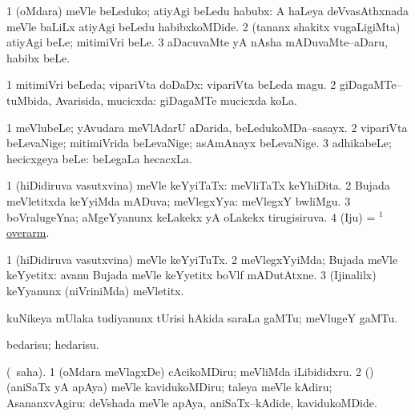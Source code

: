 \bentry
{}
\gl{\sakirx}
\bmng
\bnum
\num{1} (oMdara) meVle beLeduko; atiyAgi beLedu habubx:  A haLeya deVvasAthxnada meVle baLiLx atiyAgi beLedu habibxkoMDide. 
\num{2} (tananx shakitx \mo vugaLigiMta) atiyAgi beLe; mitimiVri beLe. 
\num{3} aDacuvaMte yA nAsha mADuvaMte--aDaru, habibx beLe. 
\enum
\emng
\eentry

\bentry
{}
\gl{\gu}
\bmng
\bnum
\num{1} mitimiVri beLeda; vipariVta doDaDx:  vipariVta beLeda magu. 
\num{2} giDagaMTe--tuMbida, Avarisida, mucicxda:  giDagaMTe mucicxda koLa. 
\enum
\emng
\eentry

\bentry
{}
\gl{\nA}
\bmng
\bnum
\num{1} meVlubeLe; yAvudara meVlAdarU aDarida, beLedukoMDa--sasayx. 
\num{2} vipariVta beLevaNige; mitimiVrida beLevaNige; asAmAnayx beLevaNige. 
\num{3} adhikabeLe; hecicxgeya beLe:  beLegaLa hecacxLa. 
\enum
\emng
\eentry

\bentry
{}
\gl{\gu}
\bmng
\bnum
\num{1} (hiDidiruva vasutxvina) meVle keYyiTaTx:  meVliTaTx keYhiDita. 
\num{2} Bujada meVletitxda keYyiMda mADuva; meVlegxYya:  meVlegxY bwliMgu. 
\num{3} boVralugeYna; aMgeYyanunx keLakekx yA oLakekx tirugisiruva. 
\num{4} (Iju) = \hyperlink{overarm(1)}{$^1$overarm}. 
\enum
\emng
\eentry

\bentry
{}
\gl{\kirxvi}
\bmng
\bnum
\num{1} (hiDidiruva vasutxvina) meVle keYyiTuTx. 
\num{2} meVlegxYyiMda; Bujada meVle keYyetitx:  avanu Bujada meVle keYyetitx boVlf mADutAtxne. 
\num{3} (Ijinalilx) keYyanunx (niVriniMda) meVletitx. 
\enum
\emng
\eentry

\bentry
{}
\gl{\nA}
\bmng
kuNikeya mUlaka tudiyanunx tUrisi hAkida saraLa gaMTu; meVlugeY gaMTu.  
\emng
\eentry

\bentry
{}
\gl{\kirx}


\noindent
\gl{\sakirx}
\bmng
bedarisu; hedarisu. 
\emng

\noindent
\gl{\akirx}
\bmng
(\sakirx\ saha). 
\bnum
\num{1} (oMdara meVlagxDe) cAcikoMDiru; meVliMda iLibididxru. 
\num{2} (\rUpa) (aniSaTx yA apAya) meVle kavidukoMDiru; taleya meVle kAdiru; AsananxvAgiru:  deVshada meVle apAya, aniSaTx--kAdide, kavidukoMDide. 
\enum
\emng
\eentry

